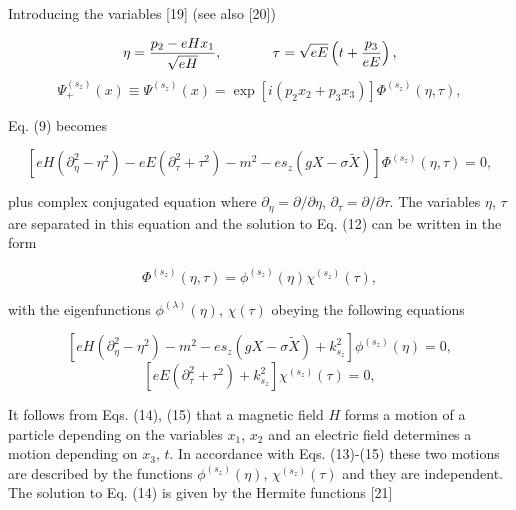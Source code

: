 \documentclass[a4paper,12pt]{article}
\begin{document}
Introducing the variables [19] (see also [20])

\[
\eta =\frac{p_2-eHx_1}{\sqrt{eH}},\hspace{0.5in}\tau =\sqrt{eE}\left( t+
\frac{p_3}{eE}\right),
\]
\vspace{-8mm}
\begin{equation}  \label{11}
\end{equation}
\vspace{-8mm}
\[
\Psi _{+}^{(s_z)}(x)\equiv \Psi ^{(s_z)}(x)=\exp \left[ i\left(
p_2x_2+p_3x_3\right) \right] \Phi ^{(s_z)}(\eta ,\tau ),
\]

Eq. (9) becomes

\begin{equation}
\left[ eH\left( \partial _\eta ^2-\eta ^2\right) -eE\left( \partial _\tau
^2+\tau ^2\right) -m^2-es_z\left( gX-\sigma \widetilde{X}\right) \right]
\Phi ^{(s_z)}(\eta ,\tau )=0,  \label{12}
\end{equation}

plus complex conjugated equation where $\partial _\eta =\partial /\partial
\eta $, $\partial _\tau =\partial /\partial \tau $. The variables $\eta $,
$\tau $ are separated in this equation and the solution to Eq. (12) can be
written in the form

\begin{equation}
\Phi ^{(s_z)}(\eta ,\tau )=\phi ^{(s_z)}(\eta )\chi ^{(s_z)}(\tau ),
\label{13}
\end{equation}

with the eigenfunctions $\phi ^{(\lambda )}(\eta )$, $\chi (\tau )$ obeying
the following equations

\begin{equation}
\left[ eH\left( \partial _\eta ^2-\eta ^2\right) -m^2-es_z\left( gX-\sigma
\widetilde{X}\right) +k_{s_z}^2\right] \phi ^{(s_z)}(\eta )=0,  \label{14}
\end{equation}
\begin{equation}
\left[ eE\left( \partial _\tau ^2+\tau ^2\right) +k_{s_z}^2\right] \chi
^{(s_z)}(\tau )=0,  \label{15}
\end{equation}

It follows from Eqs. (14), (15) that a magnetic field $H$ forms a motion of
a particle depending on the variables $x_1$, $x_2$ and an electric field
determines a motion depending on $x_3$, $t$. In accordance with Eqs.
(13)-(15) these two motions are described by the functions $\phi
^{(s_z)}(\eta )$, $\chi ^{(s_z)}(\tau )$ and they are independent. The
solution to Eq. (14) is given by the Hermite functions [21]
\end{document}
